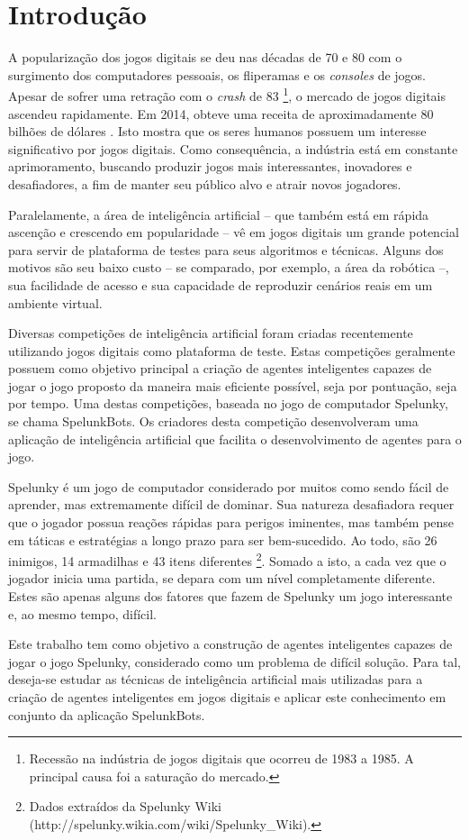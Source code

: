 \chapter{\label{chap:intro}Introdução}
A popularização dos jogos digitais se deu nas décadas de 70 e 80 com o
surgimento dos computadores pessoais, os fliperamas e os \textit{consoles} de
jogos. Apesar de sofrer uma retração com o \textit{crash} de 83
\footnote{Recessão na indústria de jogos digitais que ocorreu de 1983 a 1985. A
principal causa foi a saturação do mercado.}, o mercado de jogos digitais
ascendeu rapidamente. Em 2014, obteve uma receita de aproximadamente 80 bilhões
de dólares \cite{VIDEOGAMEREVENUE}. Isto mostra que os seres humanos possuem um
interesse significativo por jogos digitais. Como consequência, a indústria está
em constante aprimoramento, buscando produzir jogos mais interessantes,
inovadores e desafiadores, a fim de manter seu público alvo e atrair novos
jogadores.

Paralelamente, a área de inteligência artificial -- que também está em rápida
ascenção e crescendo em popularidade -- vê em jogos digitais um grande
potencial para servir de plataforma de testes para seus algoritmos e técnicas.
Alguns dos motivos são seu baixo custo -- se comparado, por exemplo, a área da
robótica --, sua facilidade de acesso e sua capacidade de reproduzir cenários
reais em um ambiente virtual.

Diversas competições de inteligência artificial foram criadas recentemente
utilizando jogos digitais como plataforma de teste. Estas competições
geralmente possuem como objetivo principal a criação de agentes inteligentes
capazes de jogar o jogo proposto da maneira mais eficiente possível, seja por
pontuação, seja por tempo. Uma destas competições, baseada no jogo de
computador Spelunky, se chama SpelunkBots. Os criadores desta competição
desenvolveram uma aplicação de inteligência artificial que facilita o
desenvolvimento de agentes para o jogo.

Spelunky é um jogo de computador considerado por muitos como sendo fácil de
aprender, mas extremamente difícil de dominar. Sua natureza desafiadora requer
que o jogador possua reações rápidas para perigos iminentes, mas também pense
em táticas e estratégias a longo prazo para ser bem-sucedido. Ao todo, são 26
inimigos, 14 armadilhas e 43 itens diferentes \footnote{Dados extraídos da
Spelunky Wiki (http://spelunky.wikia.com/wiki/Spelunky\_Wiki).}. Somado a isto, a
cada vez que o jogador inicia uma partida, se depara com um nível completamente
diferente. Estes são apenas alguns dos fatores que fazem de Spelunky um jogo
interessante e, ao mesmo tempo, difícil.

Este trabalho tem como objetivo a construção de agentes inteligentes capazes de
jogar o jogo Spelunky, considerado como um problema de difícil solução. Para
tal, deseja-se estudar as técnicas de inteligência artificial mais utilizadas
para a criação de agentes inteligentes em jogos digitais e aplicar este
conhecimento em conjunto da aplicação SpelunkBots.
